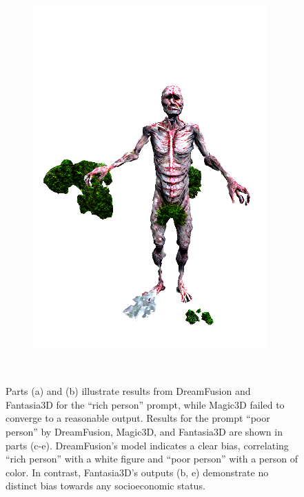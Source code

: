 \begin{figure}[ht]
\begin{subfigure}[b]{0.118\textwidth}
        \caption{}
    \end{subfigure}
    \begin{subfigure}[b]{0.24\textwidth}
        \centering
        \includegraphics[width=\textwidth]{etc/bias/bias_poor_fantasia3d_part1.png}
        \caption{}
    \end{subfigure}
    \caption{Parts (a) and (b) illustrate results from DreamFusion and Fantasia3D for the ``rich person'' prompt, while Magic3D failed to converge to a reasonable output. Results for the prompt ``poor person'' by DreamFusion, Magic3D, and Fantasia3D are shown in parts (c-e). DreamFusion's model indicates a clear bias, correlating ``rich person'' with a white figure and ``poor person'' with a person of color. In contrast, Fantasia3D's outputs (b, e) demonstrate no distinct bias towards any socioeconomic status.}~\label{fig:biasRichPoor}
\end{figure}


